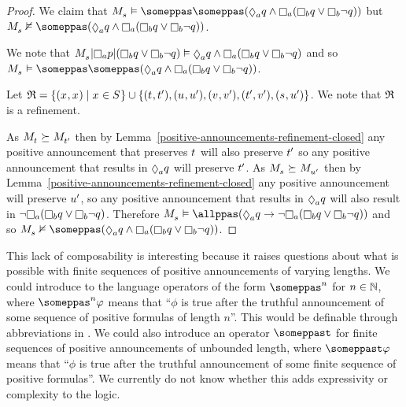\begin{proof}
We claim that $\kPModel{\kStateS} \entails \someppas \someppas (\suspectsA \atomQ \land \knowsA (\knowsB \atomQ \lor \knowsB \neg \atomQ))$ but $\kPModel{\kStateS} \nentails \someppas (\suspectsA \atomQ \land \knowsA (\knowsB \atomQ \lor \knowsB \neg \atomQ))$.

We note that $\restrict{\restrict{\kPModel{\kStateS}}{\knowsA \atomP}}{(\knowsB \atomQ \lor \knowsB \neg \atomQ)} \entails \suspectsA \atomQ \land \knowsA (\knowsB \atomQ \lor \knowsB \neg \atomQ)$ and so $\kPModel{\kStateS} \entails \someppas \someppas (\suspectsA \atomQ \land \knowsA (\knowsB \atomQ \lor \knowsB \neg \atomQ))$.

Let $\refinement = \{(\kStateX, \kStateX) \mid \kStateX \in \kStates\} \cup \{(\kStateT, \kStateTP), (\kStateU, \kStateUP), (\kStateV, \kStateVP), (\kStateTP, \kStateVP), (\kStateS, \kStateUP)\}$. 
We note that $\mathfrak{R}$ is a refinement.

As $\kPModel{\kStateT} \simulates \kPModel{\kStateTP}$ then by Lemma~\ref{positive-announcements-refinement-closed} any positive announcement that preserves $\kStateT$ will also preserve ${t}^{\prime}$ so any positive announcement that results in $\suspectsA \atomQ$ will preserve ${t}^{\prime}$.
As $\kPModel{\kStateS} \simulates \kPModel{\kStateUP}$ then by Lemma~\ref{positive-announcements-refinement-closed} any positive announcement will preserve ${u}^{\prime}$, so any positive announcement that results in $\suspectsA \atomQ$ will also result in $\neg \knowsA (\knowsB \atomQ \lor \knowsB \neg \atomQ)$.
Therefore $\kPModel{\kStateS} \entails \allppas (\suspectsA \atomQ \implies \neg \knowsA (\knowsB \atomQ \lor \knowsB \neg \atomQ))$ and so $\kPModel{\kStateS} \nentails \someppas (\suspectsA \atomQ \land \knowsA (\knowsB \atomQ \lor \knowsB \neg \atomQ))$.
\end{proof}

This lack of composability is interesting because it raises questions about what is possible with finite sequences of positive announcements of varying lengths.
We could introduce to the language operators of the form $\someppas^n$ for $n \in \mathbb{N}$, where $\someppas^n \phi$ means that ``$\phi$ is true after the truthful announcement of some sequence of positive formulas of length $n$''.
This would be definable through abbreviations in \langPapal{}.
We could also introduce an operator $\someppast$ for finite sequences of positive announcements of unbounded length, where $\someppast \phi$ means that ``$\phi$ is true after the truthful announcement of some finite sequence of positive formulas''.
We currently do not know whether this adds expressivity or complexity to the logic.

